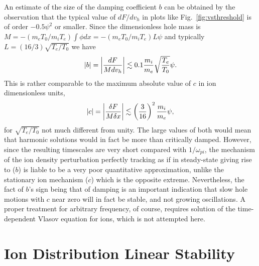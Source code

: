 \documentclass[12pt]{article}
\begin{document}
An estimate of the size of the damping coefficient $b$ can be obtained
by the observation that the typical value of $dF/dv_h$ in plots like
Fig.\ \ref{fig:vsthreshold} is of order $-0.5\psi^2$ or smaller. Since
the dimensionless hole mass is
$M=-(m_eT_0/m_iT_e)\int \phi dx=-(m_eT_0/m_iT_e)L\psi$ and typically
$L=(16/3)\sqrt{T_e/T_0}$ we have
\begin{equation}
  \label{eq:bcoef}
  |b|=\left|dF\over M dv_h\right| \lesssim 0.1{m_i\over m_e}\sqrt{T_e\over T_0}\psi.
\end{equation}
This is rather comparable to the maximum absolute value of $c$ in ion
dimensionless units,
\begin{equation}
  \label{eq:ccoef}
  |c|=\left|\delta F\over M \delta x\right| \lesssim \left(3\over
    16\right)^2{m_i\over m_e} \psi,
\end{equation}
for $\sqrt{T_e/T_0}$ not much different from unity. The large values
of both would mean that harmonic solutions would in fact be more than
critically damped. However, since the resulting timescales are very
short compared with $1/\omega_{pi}$, the mechanism of the ion density
perturbation perfectly tracking as if in steady-state giving rise to
($b$) is liable to be a very poor quantitative approximation, unlike
the stationary ion mechanism ($c$) which is the opposite
extreme. Nevertheless, the fact of $b$'s sign being that of damping is
an important indication that slow hole motions with $c$ near zero will
in fact be stable, and not growing oscillations. A proper treatment
for arbitrary frequency, of course, requires solution of the
time-dependent Vlasov equation for ions, which is not attempted here.

\section{Ion Distribution Linear Stability}\label{sec3}
\end{document}

